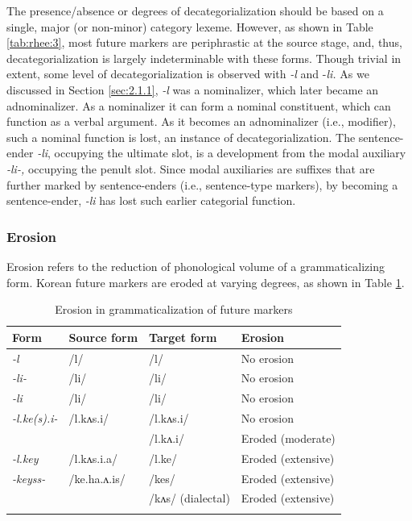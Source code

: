 \documentclass[output=paper,colorlinks,citecolor=brown]{langscibook}
\begin{document}
The presence/absence or degrees of decategorialization should be based on a single, major (or non-minor) category lexeme. However, as shown in Table \ref{tab:rhee:3}, most future markers are periphrastic at the source stage, and, thus, decategorialization is largely indeterminable with these forms. Though trivial in extent, some level of decategorialization is observed with \textit{-l} and -\textit{li.} As we discussed in Section \ref{sec:2.1.1}, \textit{-l} was a nominalizer, which later became an adnominalizer. As a nominalizer it can form a nominal constituent, which can function as a verbal argument. As it becomes an adnominalizer (i.e., modifier), such a nominal function is lost, an instance of decategorialization. The sentence-ender \textit{-li}, occupying the ultimate slot, is a development from the modal auxiliary \textit{-li-,} occupying the penult slot. Since modal auxiliaries are suffixes that are further marked by sentence-enders (i.e., sentence-type markers), by becoming a sentence-ender, \textit{-li} has lost such earlier categorial function. 


\subsubsection{Erosion}

Erosion refers to the reduction of phonological volume of a grammaticalizing form. Korean future markers are eroded at varying degrees, as shown in Table \ref{tab:rhee:4}.



\begin{table}
\caption{Erosion in grammaticalization of future markers}
\label{tab:rhee:4}
\begin{tabularx}{.85\textwidth}{p{1.5cm} p{2cm}p{2.5cm}X}
  \lsptoprule
       {Form} & {Source form} & {Target form} & {Erosion} \\
\midrule
{\textit{-l}} & /l/ & /l/ & No erosion \\
\midrule
{\textit{-li-}} & /li/ & /li/ & No erosion \\
\midrule
{\textit{-li}} & /li/ & /li/ & No erosion \\
\midrule
{{\textit{-l.ke(s).i-}}} & {/l.kʌs.i/}  & /l.kʌs.i/ & No erosion\\
& & /l.kʌ.i/ & Eroded (moderate)\\
\midrule
{\textit{-l.key}} & /l.kʌs.i.a/ & /l.ke/ & Eroded (extensive) \\
\midrule
{{\textit{-keyss-}}} & {/ke.ha.ʌ.is/} & /kes/ & Eroded (extensive) \\
& & /kʌs/ (dialectal) & Eroded (extensive) \\
  \lspbottomrule
\end{tabularx}
\end{table}
\end{document}
